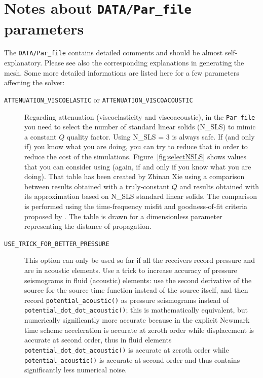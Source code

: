 \section*{Notes about \texttt{DATA/Par\_file} parameters}

The \texttt{DATA/Par\_file} contains detailed comments and should be almost self-explanatory.
Please see also the corresponding explanations in generating the mesh.
Some more detailed informations are listed here for a few parameters affecting the solver:

\begin{description}

\item[{\texttt{ATTENUATION\_VISCOELASTIC}} or {\texttt{ATTENUATION\_VISCOACOUSTIC}}]
 Regarding attenuation (viscoelasticity and viscoacoustic), in the \texttt{Par\_file} you need to select the number of standard linear solids (N\_SLS) to mimic a constant $Q$ quality factor.
Using N\_SLS = 3 is always safe. If (and only if) you know what you are doing, you can try to reduce that in order to reduce the cost of the simulations.
Figure~\ref{fig:selectNSLS} shows values that you can consider using (again, if and only if you know what you are doing). That table has been created by Zhinan Xie using
a comparison between results obtained with a truly-constant $Q$ and results obtained with its approximation based on N\_SLS standard linear solids.
The comparison is performed using the time-frequency misfit and goodness-of-fit criteria proposed by \cite{Kristekova_2009}.
The table is drawn for a dimensionless parameter representing the distance of propagation.

\item[{\texttt{USE\_TRICK\_FOR\_BETTER\_PRESSURE}}]
 This option can only be used so far if all the receivers record pressure and are in acoustic elements.
Use a trick to increase accuracy of pressure seismograms in fluid (acoustic) elements:
use the second derivative of the source for the source time function instead of the source itself,
and then record \texttt{potential\_acoustic()} as pressure seismograms instead of \texttt{potential\_dot\_dot\_acoustic()};
this is mathematically equivalent, but numerically significantly more accurate because in the explicit
Newmark time scheme acceleration is accurate at zeroth order while displacement is accurate at second order,
thus in fluid elements \texttt{potential\_dot\_dot\_acoustic()} is accurate at zeroth order while \texttt{potential\_acoustic()}
is accurate at second order and thus contains significantly less numerical noise.


\end{description}

